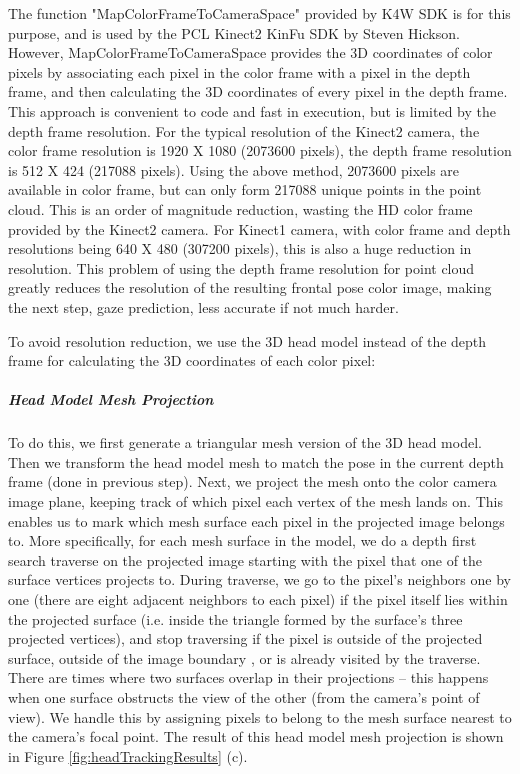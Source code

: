 The function "MapColorFrameToCameraSpace" provided by K4W SDK is for this purpose, and is used by the PCL Kinect2 KinFu SDK by Steven Hickson.  However, MapColorFrameToCameraSpace provides the 3D coordinates of color pixels by associating each pixel in the color frame with a pixel in the depth frame, and then calculating the 3D coordinates of every pixel in the depth frame.  This approach is convenient to code and fast in execution, but is limited by the depth frame resolution.  For the typical resolution of the Kinect2 camera, the color frame resolution is 1920 X 1080 (2073600 pixels), the depth frame resolution is 512 X 424 (217088 pixels).  Using the above method, 2073600 pixels are available in color frame, but can only form 217088 unique points in the point cloud.  This is an order of magnitude reduction, wasting the HD color frame provided by the Kinect2 camera.  For Kinect1 camera, with color frame and depth resolutions being 640 X 480 (307200 pixels), this is also a huge reduction in resolution.  This problem of using the depth frame resolution for point cloud greatly reduces the resolution of the resulting frontal pose color image, making the next step, gaze prediction, less accurate if not much harder.

To avoid resolution reduction, we use the 3D head model instead of the depth frame for calculating the 3D coordinates of each color pixel:

\subparagraph{Head Model Mesh Projection}
To do this, we first generate a triangular mesh version of the 3D head model.  Then we transform the head model mesh to match the pose in the current depth frame (done in previous step).  Next, we project the mesh onto the color camera image plane, keeping track of which pixel each vertex of the mesh lands on.  This enables us to mark which mesh surface each pixel in the projected image belongs to.  More specifically, for each mesh surface in the model, we do a depth first search traverse on the projected image starting with the pixel that one of the surface vertices projects to.  During traverse, we go to the pixel's neighbors one by one (there are eight adjacent neighbors to each pixel) if the pixel itself lies within the projected surface (i.e. inside the triangle formed by the surface's three projected vertices), and stop traversing if the pixel is outside of the projected surface, outside of the image boundary , or is already visited by the traverse.  There are times where two surfaces overlap in their projections -- this happens when one surface obstructs the view of the other (from the camera's point of view).  We handle this by assigning pixels to belong to the mesh surface nearest to the camera's focal point.  The result of this head model mesh projection is shown in Figure \ref{fig:headTrackingResults} (c).


